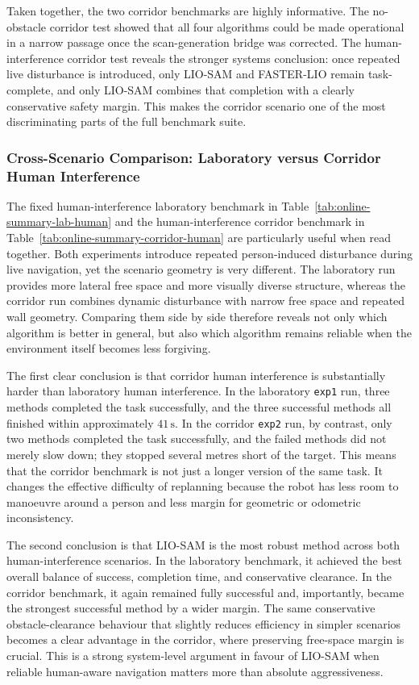 \documentclass[12pt,a4paper]{report}
\begin{document}
Taken together, the two corridor benchmarks are highly informative. The no-obstacle corridor test showed that all four algorithms could be made operational in a narrow passage once the scan-generation bridge was corrected. The human-interference corridor test reveals the stronger systems conclusion: once repeated live disturbance is introduced, only LIO-SAM and FASTER-LIO remain task-complete, and only LIO-SAM combines that completion with a clearly conservative safety margin. This makes the corridor scenario one of the most discriminating parts of the full benchmark suite.

\subsubsection{Cross-Scenario Comparison: Laboratory versus Corridor Human Interference}
The fixed human-interference laboratory benchmark in Table~\ref{tab:online-summary-lab-human} and the human-interference corridor benchmark in Table~\ref{tab:online-summary-corridor-human} are particularly useful when read together. Both experiments introduce repeated person-induced disturbance during live navigation, yet the scenario geometry is very different. The laboratory run provides more lateral free space and more visually diverse structure, whereas the corridor run combines dynamic disturbance with narrow free space and repeated wall geometry. Comparing them side by side therefore reveals not only which algorithm is better in general, but also which algorithm remains reliable when the environment itself becomes less forgiving.

The first clear conclusion is that corridor human interference is substantially harder than laboratory human interference. In the laboratory \texttt{exp1} run, three methods completed the task successfully, and the three successful methods all finished within approximately \(41\,\mathrm{s}\). In the corridor \texttt{exp2} run, by contrast, only two methods completed the task successfully, and the failed methods did not merely slow down; they stopped several metres short of the target. This means that the corridor benchmark is not just a longer version of the same task. It changes the effective difficulty of replanning because the robot has less room to manoeuvre around a person and less margin for geometric or odometric inconsistency.

The second conclusion is that LIO-SAM is the most robust method across both human-interference scenarios. In the laboratory benchmark, it achieved the best overall balance of success, completion time, and conservative clearance. In the corridor benchmark, it again remained fully successful and, importantly, became the strongest successful method by a wider margin. The same conservative obstacle-clearance behaviour that slightly reduces efficiency in simpler scenarios becomes a clear advantage in the corridor, where preserving free-space margin is crucial. This is a strong system-level argument in favour of LIO-SAM when reliable human-aware navigation matters more than absolute aggressiveness.
\end{document}
